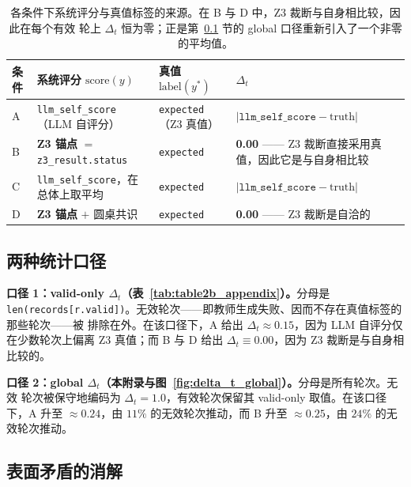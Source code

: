 \begin{table}[t]
  \centering
  \caption{各条件下系统评分与真值标签的来源。在 B 与 D 中，Z3 裁断与自身相比较，因此在每个有效
  轮上 $\Delta_t$ 恒为零；正是第~\ref{sec:calibers} 节的 global 口径重新引入了一个非零的平均值。}
  \label{tab:table2c_sources}
  \small
  \begin{tabularx}{\textwidth}{@{}l l l >{\raggedright\arraybackslash}X@{}}
    \toprule
    条件 & 系统评分 $\text{score}(y)$ & 真值 $\text{label}(y^{*})$ & $\Delta_t$ \\
    \midrule
    A & \texttt{llm\_self\_score}（LLM 自评分） & \texttt{expected}（Z3 真值） &
        $\bigl|\texttt{llm\_self\_score} - \text{truth}\bigr|$ \\
    B & \textbf{Z3 锚点} $=$ \texttt{z3\_result.status} & \texttt{expected} &
        \textbf{0.00} —— Z3 裁断直接采用真值，因此它是与自身相比较 \\
    C & \texttt{llm\_self\_score}，在总体上取平均 & \texttt{expected} &
        $\bigl|\texttt{llm\_self\_score} - \text{truth}\bigr|$ \\
    D & \textbf{Z3 锚点} $+$ 圆桌共识 & \texttt{expected} &
        \textbf{0.00} —— Z3 裁断是自洽的 \\
    \bottomrule
  \end{tabularx}
\end{table}

\subsection{两种统计口径}
\label{sec:calibers}

\textbf{口径 1：valid-only $\Delta_t$（表~\ref{tab:table2b_appendix}）。}分母是
\texttt{len(records[r.valid])}。无效轮次——即教师生成失败、因而不存在真值标签的那些轮次——被
排除在外。在该口径下，A 给出 $\Delta_t \approx 0.15$，因为 LLM 自评分仅在少数轮次上偏离 Z3
真值；而 B 与 D 给出 $\Delta_t \equiv 0.00$，因为 Z3 裁断是与自身相比较的。

\textbf{口径 2：global $\Delta_t$（本附录与图~\ref{fig:delta_t_global}）。}分母是所有轮次。无效
轮次被保守地编码为 $\Delta_t = 1.0$，有效轮次保留其 valid-only 取值。在该口径下，A 升至
$\approx 0.24$，由 $11\%$ 的无效轮次推动，而 B 升至 $\approx 0.25$，由 $24\%$ 的无效轮次推动。

\subsection{表面矛盾的消解}

